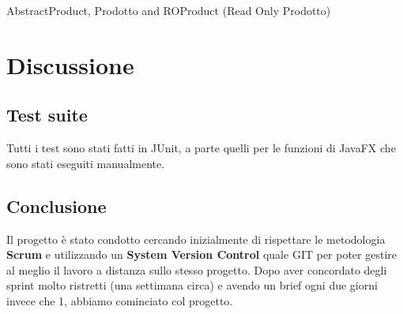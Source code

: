 \documentclass[12pt, a4paper]{report}
\begin{document}
AbstractProduct, Prodotto and ROProduct (Read Only Prodotto)


\chapter{Discussione}

\section{Test suite}

Tutti i test sono stati fatti in JUnit, a parte quelli per le funzioni di
JavaFX che sono stati eseguiti manualmente.


\section{Conclusione}

Il progetto è stato condotto cercando inizialmente di rispettare le metodologia
\textbf{Scrum} e utilizzando un \textbf{System Version Control} quale GIT per
poter gestire al meglio il lavoro a distanza sullo stesso progetto. Dopo aver
concordato degli sprint molto ristretti (una settimana circa) e avendo un brief
ogni due giorni invece che 1, abbiamo cominciato col progetto.
\end{document}

